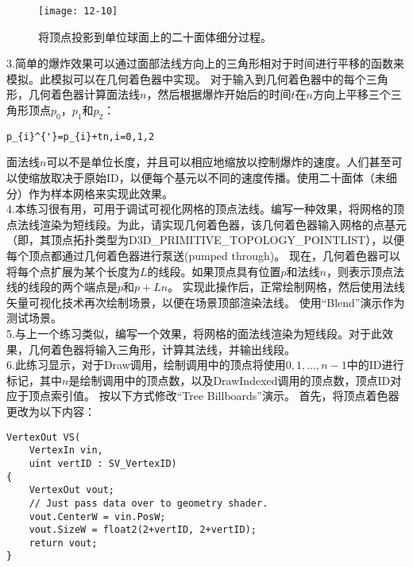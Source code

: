 \begin{figure}[h]
    \texttt{[image: 12-10]}
    \centering
    \caption{将顶点投影到单位球面上的二十面体细分过程。}
    \label{fig:12-10}
\end{figure}

\begin{flushleft}
3.简单的爆炸效果可以通过面部法线方向上的三角形相对于时间进行平移的函数来模拟。此模拟可以在几何着色器中实现。 对于输入到几何着色器中的每个三角形，几何着色器计算面法线$n$，然后根据爆炸开始后的时间$t$在$n$方向上平移三个三角形顶点$p_{0}$，$p_{1}$和$p_{2}$：\\

\begin{lstlisting}
p_{i}^{'}=p_{i}+tn,i=0,1,2
\end{lstlisting}

\begin{flushleft}
面法线$n$可以不是单位长度，并且可以相应地缩放以控制爆炸的速度。人们甚至可以使缩放取决于原始ID，以便每个基元以不同的速度传播。使用二十面体（未细分）作为样本网格来实现此效果。\\

4.本练习很有用，可用于调试可视化网格的顶点法线。编写一种效果，将网格的顶点法线渲染为短线段。为此，请实现几何着色器，该几何着色器输入网格的点基元（即，其顶点拓扑类型为D3D\_PRIMITIVE\_TOPOLOGY\_POINTLIST），以便每个顶点都通过几何着色器进行泵送(pumped through)。 现在，几何着色器可以将每个点扩展为某个长度为$L$的线段。如果顶点具有位置$p$和法线$n$，则表示顶点法线的线段的两个端点是$p$和$p+Ln$。 实现此操作后，正常绘制网格，然后使用法线矢量可视化技术再次绘制场景，以便在场景顶部渲染法线。 使用“Blend”演示作为测试场景。\\

5.与上一个练习类似，编写一个效果，将网格的面法线渲染为短线段。对于此效果，几何着色器将输入三角形，计算其法线，并输出线段。\\

6.此练习显示，对于Draw调用，绘制调用中的顶点将使用$0,1,...,n-1$中的ID进行标记，其中$n$是绘制调用中的顶点数，以及DrawIndexed调用的顶点数，顶点ID对应于顶点索引值。 按以下方式修改“Tree Billboards”演示。 首先，将顶点着色器更改为以下内容：\\
\end{flushleft}

\begin{lstlisting}
VertexOut VS(
    VertexIn vin, 
    uint vertID : SV_VertexID)
{
    VertexOut vout;
    // Just pass data over to geometry shader.
    vout.CenterW = vin.PosW;
    vout.SizeW = float2(2+vertID, 2+vertID);
    return vout;
}
\end{lstlisting}


\end{flushleft}
